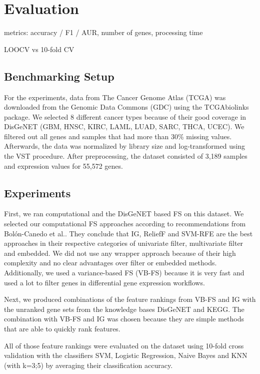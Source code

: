 \chapter{Evaluation}
\label{chapter:evaluation}

metrics: accuracy / F1 / AUR, number of genes, processing time

LOOCV vs 10-fold CV

\section{Benchmarking Setup}
\label{sec:benchmarkSetup}

For the experiments, data from The Cancer Genome Atlas (TCGA) was downloaded from the Genomic Data Commons (GDC) using the TCGAbiolinks package\cite{colaprico2015tcgabiolinks,grossman2016toward,weinstein2013cancer}. 
We selected 8 different cancer types because of their good coverage in DisGeNET (GBM, HNSC, KIRC, LAML, LUAD, SARC, THCA, UCEC). 
We filtered out all genes and samples that had more than 30\% missing values. 
Afterwards, the data was normalized by library size and log-transformed using the VST\cite{durbin2002variance} procedure. 
After preprocessing, the dataset consisted of 3,189 samples and expression values for 55,572 genes. 

\section{Experiments}
\label{sec:experiments}

First, we ran computational and the DisGeNET based FS on this dataset. 
We selected our computational FS approaches according to recommendations from Bol\'{o}n-Canedo et al.\cite{bolon2014review,bolon2013review}.
They conclude that IG, ReliefF and SVM-RFE are the best approaches in their respective categories of univariate filter, multivariate filter and embedded.
We did not use any wrapper approach because of their high complexity and no clear advantages over filter or embedded methods.
Additionally, we used a variance-based FS (VB-FS) because it is very fast and used a lot to filter genes in differential gene expression workflows.

Next, we produced combinations of the feature rankings from VB-FS and IG with the unranked gene sets from the knowledge bases DisGeNET and KEGG.
The combination with VB-FS and IG was chosen because they are simple methods that are able to quickly rank features. 

All of those feature rankings were evaluated on the dataset using 10-fold cross validation with the classifiers SVM, Logistic Regression, Naive Bayes and KNN (with k=3;5) by averaging their classification accuracy.

